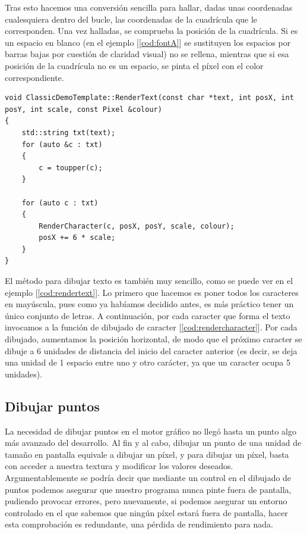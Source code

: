 Tras esto hacemos una conversión sencilla para hallar, dadas unas coordenadas cualesquiera dentro del bucle, las coordenadas de la cuadrícula que le corresponden. Una vez halladas, se comprueba la posición de la cuadrícula. Si es un espacio en blanco (en el ejemplo [\ref{cod:fontA}] se sustituyen los espacios por barras bajas por cuestión de claridad visual) no se rellena, mientras que si esa posición de la cuadrícula no es un espacio, se pinta el píxel con el color correspondiente.\\

\begin{lstlisting}[style=C-color, caption={Método que renderiza una cadena de caracteres},label=cod:rendertext]
void ClassicDemoTemplate::RenderText(const char *text, int posX, int posY, int scale, const Pixel &colour)
{
    std::string txt(text);
    for (auto &c : txt)
    {
        c = toupper(c);
    }

    for (auto c : txt)
    {
        RenderCharacter(c, posX, posY, scale, colour);
        posX += 6 * scale;
    }
}
\end{lstlisting}

El método para dibujar texto es también muy sencillo, como se puede ver en el ejemplo [\ref{cod:rendertext}]. Lo primero que hacemos es poner todos los caracteres en mayúscula, pues como ya habíamos decidido antes, es más práctico tener un único conjunto de letras. A continuación, por cada caracter que forma el texto invocamos a la función de dibujado de caracter [\ref{cod:rendercharacter}]. Por cada dibujado, aumentamos la posición horizontal, de modo que el próximo caracter se dibuje a 6 unidades de distancia del inicio del caracter anterior (es decir, se deja una unidad de 1 espacio entre uno y otro carácter, ya que un caracter ocupa 5 unidades).

\subsection{Dibujar puntos}

La necesidad de dibujar puntos en el motor gráfico no llegó hasta un punto algo más avanzado del desarrollo. Al fin y al cabo, dibujar un punto de una unidad de tamaño en pantalla equivale a dibujar un píxel, y para dibujar un píxel, basta con acceder a nuestra textura y modificar los valores deseados.\\

Argumentablemente se podría decir que mediante un control en el dibujado de puntos podemos asegurar que nuestro programa nunca pinte fuera de pantalla, pudiendo provocar errores, pero nuevamente, si podemos asegurar un entorno controlado en el que sabemos que ningún píxel estará fuera de pantalla, hacer esta comprobación es redundante, una pérdida de rendimiento para nada.\\

